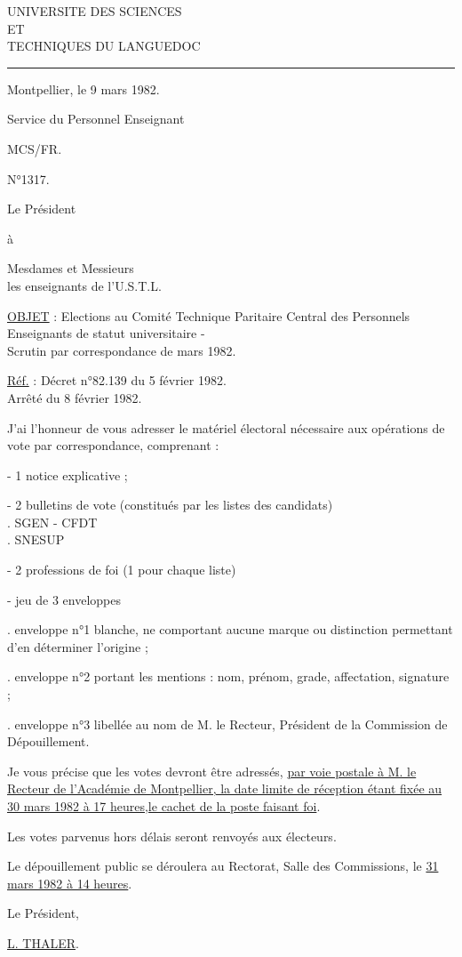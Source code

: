 \begin{center}
UNIVERSITE DES SCIENCES\\
ET\\
TECHNIQUES DU LANGUEDOC
\end{center}
\hrule

Montpellier, le 9 mars 1982.

Service du Personnel Enseignant

MCS/FR.

N°1317.

Le Président

à

Mesdames et Messieurs\\
les enseignants de l'U.S.T.L.

\uline{OBJET} : Elections au Comité Technique Paritaire Central des Personnels Enseignants de statut universitaire -\\
Scrutin par correspondance de mars 1982.

\uline{Réf.} : Décret n°82.139 du 5 février 1982.\\
Arrêté du 8 février 1982.

J'ai l'honneur de vous adresser le matériel électoral nécessaire aux opérations de vote par correspondance, comprenant :

- 1 notice explicative ;

- 2 bulletins de vote (constitués par les listes des candidats)\\
\hspace*{2em}. SGEN - CFDT\\
\hspace*{2em}. SNESUP

- 2 professions de foi (1 pour chaque liste)

- jeu de 3 enveloppes

\hspace*{2em}. enveloppe n°1 blanche, ne comportant aucune marque ou distinction permettant d'en déterminer l'origine ;

\hspace*{2em}. enveloppe n°2 portant les mentions : nom, prénom, grade, affectation, signature ;

\hspace*{2em}. enveloppe n°3 libellée au nom de M. le Recteur, Président de la Commission de Dépouillement.

Je vous précise que les votes devront être adressés, \uline{par voie postale à M. le Recteur de l'Académie de Montpellier, la date limite de réception étant fixée au 30 mars 1982 à 17 heures,le cachet de la poste faisant foi}.

Les votes parvenus hors délais seront renvoyés aux électeurs.

Le dépouillement public se déroulera au Rectorat, Salle des Commissions, le \uline{31 mars 1982 à 14 heures}.

Le Président,


\uline{L. THALER}.
